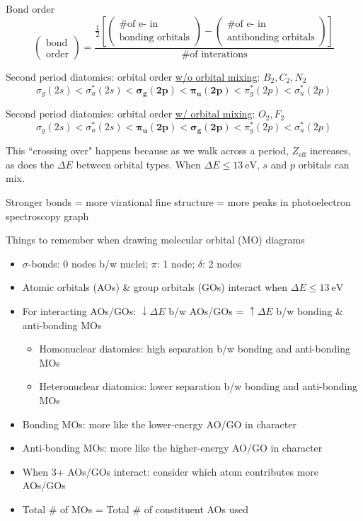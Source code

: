 \documentclass[10pt,landscape]{article}
\begin{document}
\begin{multicols}{3}
Bond order
\[
\begin{pmatrix}
	\text{bond} \\
	\text{order} 
\end{pmatrix}
= 
\frac{
	\frac{1}{2}
	\left[
		\begin{pmatrix}
			\text{\# of e- in } \\
			\text{bonding orbitals} 
		\end{pmatrix}
		-
		\begin{pmatrix}
			\text{\# of e- in } \\
			\text{antibonding orbitals} 
		\end{pmatrix}
	\right]
}{\text{\# of interations}}
\]

Second period diatomics: orbital order \underline{w/o orbital mixing}: $B_2, C_2, N_2$
\[ \sigma_g(2s) < \sigma_u^*(2s) < \mathbf{\sigma_g(2p) < \pi_u(2p)} < \pi_g^*(2p) < \sigma_u^*(2p) \]

Second period diatomics: orbital order \underline{w/ orbital mixing}: $O_2, F_2$
\[ \sigma_g(2s) < \sigma_u^*(2s) < \mathbf{\pi_u(2p) < \sigma_g(2p)} < \pi_g^*(2p) < \sigma_u^*(2p) \]

This ``crossing over" happens because as we walk across a period, $Z_\text{eff}$ increases, as does the $\Delta E$ between orbital types. When $\Delta E \leq \SI{13}{\electronvolt}$, $s$ and $p$ orbitals can mix.

Stronger bonds = more virational fine structure = more peaks in photoelectron spectroscopy graph

Things to remember when drawing molecular orbital (MO) diagrams
\begin{itemize}
	\item $\sigma$-bonds: 0 nodes b/w nuclei; $\pi$: 1 node; $\delta$: 2 nodes 
	\item Atomic orbitals (AOs) \& group orbitals (GOs) interact when $\Delta E \leq \SI{13}{\electronvolt}$
	\item For interacting AOs/GOs: $\downarrow \Delta E$ b/w AOs/GOs = $\uparrow \Delta E$ b/w bonding \& anti-bonding MOs
	\begin{itemize}
			\item Homonuclear diatomics: high separation b/w bonding and anti-bonding MOs
			\item Heteronuclear diatomics: lower separation b/w bonding and anti-bonding MOs
	\end{itemize}
	\item Bonding MOs: more like the lower-energy AO/GO in character
	\item Anti-bonding MOs: more like the higher-energy AO/GO in character
	\item When 3+ AOs/GOs interact: consider which atom contributes more AOs/GOs
	\item Total \# of MOs = Total \# of constituent AOs used
\end{itemize}


\end{multicols}
\end{document}
